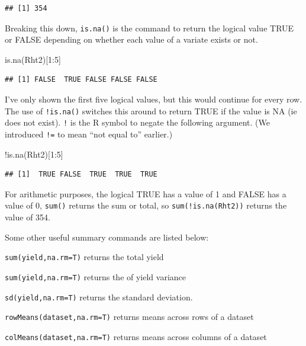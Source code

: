 \documentclass[
]{book}
\newenvironment{Shaded}{\begin{snugshade}}{\end{snugshade}}
\newcommand{\DecValTok}[1]{\textcolor[rgb]{0.00,0.00,0.81}{#1}}
\newcommand{\FunctionTok}[1]{\textcolor[rgb]{0.00,0.00,0.00}{#1}}
\newcommand{\NormalTok}[1]{#1}
\newcommand{\SpecialCharTok}[1]{\textcolor[rgb]{0.00,0.00,0.00}{#1}}
\begin{document}
\begin{verbatim}
## [1] 354
\end{verbatim}

Breaking this down, \texttt{is.na()} is the command to return the logical value TRUE or FALSE depending on whether each value of a variate exists or not.

\begin{Shaded}
\begin{Highlighting}[]
\FunctionTok{is.na}\NormalTok{(Rht2)[}\DecValTok{1}\SpecialCharTok{:}\DecValTok{5}\NormalTok{]}
\end{Highlighting}
\end{Shaded}

\begin{verbatim}
## [1] FALSE  TRUE FALSE FALSE FALSE
\end{verbatim}

I've only shown the first five logical values, but this would continue for every row. The use of \texttt{!is.na()} switches this around to return TRUE if the value is NA (ie does not exist). \texttt{!} is the R symbol to negate the following argument. (We introduced \texttt{!=} to mean ``not equal to'' earlier.)

\begin{Shaded}
\begin{Highlighting}[]
\SpecialCharTok{!}\FunctionTok{is.na}\NormalTok{(Rht2)[}\DecValTok{1}\SpecialCharTok{:}\DecValTok{5}\NormalTok{]}
\end{Highlighting}
\end{Shaded}

\begin{verbatim}
## [1]  TRUE FALSE  TRUE  TRUE  TRUE
\end{verbatim}

For arithmetic purposes, the logical TRUE has a value of 1 and FALSE has a value of 0, \texttt{sum()} returns the sum or total, so \texttt{sum(!is.na(Rht2))} returns the value of 354.

Some other useful summary commands are listed below:

\texttt{sum(yield,na.rm=T)} returns the total yield

\texttt{sum(yield,na.rm=T)} returns the of yield variance

\texttt{sd(yield,na.rm=T)} returns the standard deviation.

\texttt{rowMeans(dataset,na.rm=T)} returns means across rows of a dataset

\texttt{colMeans(dataset,na.rm=T)} returns means across columns of a dataset
\end{document}
